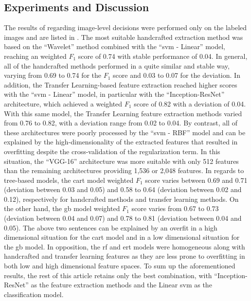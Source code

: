 \documentclass[journal,article,accept,moreauthors,pdftex, applsci]{Definitions/mdpi}
\newcommand{\fscore}{$F_{1}$ score}
\begin{document}
\subsection{Experiments and Discussion}
The results of  regarding image-level decisions were performed only on the labeled images and are listed in . The most suitable handcrafted extraction method was based on the “Wavelet” method combined with the “\ac{svm} - Linear” model, reaching an weighted \fscore{} of 0.74 with stable performance of 0.04. In general, all of the handcrafted methods performed in a quite similar and stable way, varying from 0.69 to 0.74 for the \fscore{} and 0.03 to 0.07 for the deviation. In addition, the Transfer Learning-based feature extraction reached higher scores with the “\ac{svm} - Linear” model, in particular with the “Inception-ResNet” architecture, which achieved a weighted \fscore{} of 0.82 with a deviation of 0.04. With this same model, the Transfer Learning feature extraction methods varied from 0.76 to 0.82, with a deviation range from 0.02 to 0.04. By contrast, all of these architectures were poorly processed by the “\ac{svm} - RBF” model and can be explained by the high-dimensionality of the extracted features that resulted in overfitting despite the cross-validation of the regularization term. In this situation, the “VGG-16” architecture was more suitable with only 512 features than the remaining architectures providing 1,536 or 2,048 features. In regards to tree-based models, the \ac{cart} model weighted \fscore{} varies between 0.69 and 0.71 (deviation between 0.03 and 0.05) and 0.58 to 0.64 (deviation between 0.02 and 0.12), respectively for handcrafted methods and transfer learning methods. On the other hand, the \ac{gb} model weighted \fscore{} varies from 0.67 to 0.73 (deviation between 0.04 and 0.07) and 0.78 to 0.81 (deviation between 0.04 and 0.05). The above two sentences can be explained by an overfit in a high dimensional situation for the \ac{cart} model and in a low dimensional situation for the \ac{gb} model. In opposition, the \ac{rf} and \ac{ert} models were homogeneous along with handcrafted and transfer learning features as they are less prone to overfitting in both low and high dimensional feature spaces. To sum up the aforementioned results, the rest of this article retains only the best combination, with “Inception-ResNet” as the feature extraction methods and the Linear \ac{svm} as the classification model.\par
\end{document}
